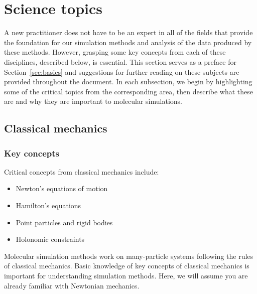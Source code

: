 \documentclass[9pt,bestpractices]{livecoms}
\begin{document}
\section{Science topics}
\label{sec:science}
A new practitioner does not have to be an expert in all of the fields that provide the foundation for our simulation methods and analysis of the data produced by these methods.
However, grasping some key concepts from each of these disciplines, described below, is essential.
This section serves as a preface for Section~\ref{sec:basics} and suggestions for further reading on these subjects are provided throughout the document.
In each subsection, we begin by highlighting some of the critical topics from the corresponding area, then describe what these are and why they are important to molecular simulations.

\subsection{Classical mechanics}
\label{sec:classical_mechanics}
\subsubsection{Key concepts}

Critical concepts from classical mechanics include:
\begin{itemize}
\item Newton's equations of motion
\item Hamilton's equations
\item Point particles and rigid bodies
\item Holonomic constraints
\end{itemize}

Molecular simulation methods work on many-particle systems following the rules of classical mechanics.
Basic knowledge of key concepts of classical mechanics is important for understanding simulation methods.
Here, we will assume you are already familiar with Newtonian mechanics.
\end{document}
